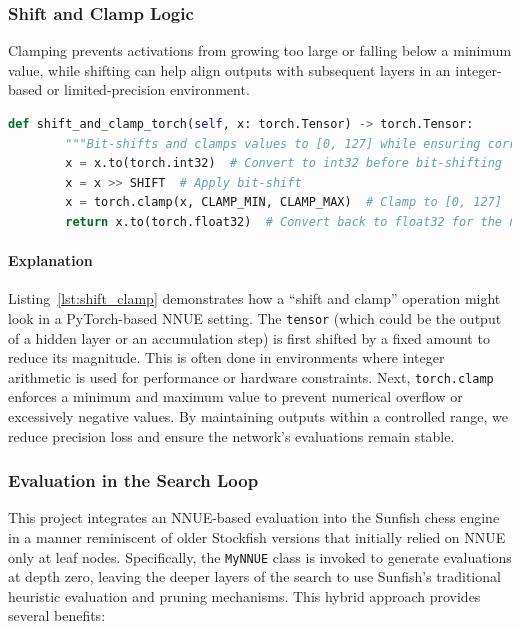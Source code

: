\documentclass[12pt,a4paper]{article}
\begin{document}
\subsubsection*{Shift and Clamp Logic}
Clamping prevents activations from growing too large or falling below a minimum value, while shifting can help align outputs with subsequent layers in an integer-based or limited-precision environment.

\begin{lstlisting}[language=Python,
                   caption={Example of a shift and clamp step},
                   label={lst:shift_clamp},
                   basicstyle=\footnotesize\ttfamily,
                   breaklines=true]
def shift_and_clamp_torch(self, x: torch.Tensor) -> torch.Tensor:
        """Bit-shifts and clamps values to [0, 127] while ensuring correct data types."""
        x = x.to(torch.int32)  # Convert to int32 before bit-shifting
        x = x >> SHIFT  # Apply bit-shift
        x = torch.clamp(x, CLAMP_MIN, CLAMP_MAX)  # Clamp to [0, 127]
        return x.to(torch.float32)  # Convert back to float32 for the neural network
\end{lstlisting}

\paragraph{Explanation}
Listing~\ref{lst:shift_clamp} demonstrates how a “shift and clamp” operation might look in a PyTorch-based NNUE setting. The \texttt{tensor} (which could be the output of a hidden layer or an accumulation step) is first shifted by a fixed amount to reduce its magnitude. This is often done in environments where integer arithmetic is used for performance or hardware constraints. Next, \texttt{torch.clamp} enforces a minimum and maximum value to prevent numerical overflow or excessively negative values. By maintaining outputs within a controlled range, we reduce precision loss and ensure the network’s evaluations remain stable.


    \subsubsection{Evaluation in the Search Loop}
    \label{sec:integration}
    This project integrates an NNUE-based evaluation into the Sunfish chess engine in a manner reminiscent of older Stockfish versions that initially relied on NNUE only at leaf nodes. Specifically, the \texttt{MyNNUE} class is invoked to generate evaluations at depth zero, leaving the deeper layers of the search to use Sunfish’s traditional heuristic evaluation and pruning mechanisms. This hybrid approach provides several benefits:
\end{document}
